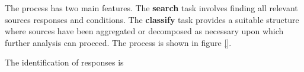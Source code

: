 The process has two main features. 
The \textbf{search} task involves finding all relevant sources responses and conditions. 
The \textbf{classify} task provides a suitable structure where sources have been aggregated or decomposed as necessary upon which further analysis can proceed.
The process is shown in figure \ref{}.


The identification of responses is 







